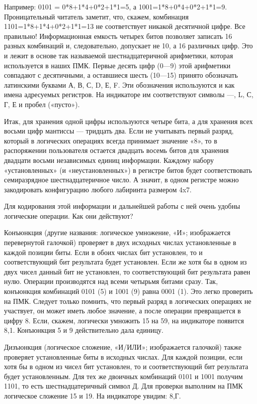 \documentclass[11pt,a4paper,oneside]{article}
\begin{document}
Например: 0101 = 0*8+1*4+0*2+1*1=5, а 1001=1*8+0*4+0*2+1*1=9. Проницательный читатель заметит, что, скажем, комбинация 1101=1*8+1*4+0*2+1*1=13 не соответствует никакой десятичной цифре. Все правильно! Информационная емкость четырех битов позволяет записать 16 разных комбинаций и, следовательно, допускает не 10, а 16 различных цифр. Это и лежит в основе так называемой шестнадцатеричной арифметики, которая используется в наших ПМК. Первые десять цифр (0—9) этой арифметики совпадают с десятичными, а оставшиеся шесть (10—15) принято обозначать латинскими буквами А, В, С, D, Е, F. Эти обозначения используются и как имена адресуемых регистров. На индикаторе им соответствуют символы —, L, С, Г, Е и пробел («пусто»).

Итак, для хранения одной цифры используются четыре бита, а для хранения всех восьми цифр мантиссы — тридцать два. Если не учитывать первый разряд, который в логических операциях  всегда принимает значение «8», то в распоряжении пользователя остается двадцать восемь битов для хранения двадцати восьми независимых единиц информации. Каждому набору «установленных» (и «неустановленных») в регистре битов будет соответствовать семиразрядное шестнадцатеричное число. А значит, в одном регистре можно закодировать конфигурацию любого лабиринта размером 4x7.

Для кодирования этой информации и дальнейшей работы с ней очень удобны логические операции. Как они действуют?

Конъюнкция (другие названия: логическое умножение, «И»; изображается перевернутой галочкой) проверяет в двух исходных числах установленные в каждой позиции биты. Если в обоих числах бит установлен, то и соответствующий бит результата будет установлен. Если же хотя бы в одном из двух чисел данный бит не установлен, то соответствующий бит результата равен нулю. Операции производятся над всеми четырьмя битами сразу. Так, конъюнкция комбинаций 0101 (5) и 1001 (9) равна 0001 (1). Это легко проверить на ПМК. Следует только помнить, что первый разряд в логических операциях не участвует, он может иметь любое значение, а после операции превращается в цифру 8. Если, скажем, логически умножить 15 на 59, на индикаторе появится 8,1. Конъюнкция 5 и 9 действительно дала единицу.

Дизъюнкция (логическое сложение, «И/ИЛИ»; изображается галочкой) также проверяет установленные биты в исходных числах. Для каждой позиции, если хотя бы в одном из чисел бит установлен, то и соответствующий бит результата будет установленным. Для тех же двоичных комбинаций 0101 и 1001 получим 1101, то есть шестнадцатеричный символ Д. Для проверки выполним на ПМК логическое сложение 15 и 19. На индикаторе увидим: 8,Г.
\end{document}
